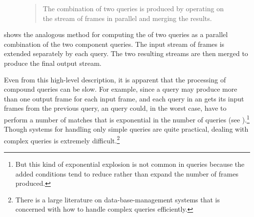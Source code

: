 \begin{figure}[tb]
\label{Figure 4.6}
\centering
\begin{comment}
\heading{Figure 4.6:} The \code{or} combination of two queries is produced
by operating on the stream of frames in parallel and merging the results.

\begin{example}
           +---------------------------+
           |          (or A B)         |
           |    +---+                  |
input      | +->| A |------------+     |  output
stream of  | |  +---+            V     |  stream of
frames     | |    ^          +-------+ |  frames
-------------*    |          | merge +--------------->
           | |    |          +-------+ |
           | |    |              ^     |
           | |    |   +---+      |     |
           | +------->| B +------+     |
           |      |   +---+            |
           |      |     ^              |
           |      |     |              |
           |      +--*--+              |
           +---------|-----------------+
                     |
                 data base
\end{example}
\end{comment}

\begin{quote}
 The  combination of two queries is produced by operating on the stream of frames in parallel and merging the results.
\end{quote}
\end{figure}

 shows the analogous method for computing the
 of two
queries as a parallel combination of the two component queries.  The input
stream of frames is extended separately by each query.  The two resulting
streams are then merged to produce the final output stream.

Even from this high-level description, it is apparent that the processing of
compound queries can be slow.  For example, since a query may produce more than
one output frame for each input frame, and each query in an  gets its
input frames from the previous query, an  query could, in the worst
case, have to perform a number of matches that is exponential in the number of
queries (see ).\footnote{But this kind of exponential
explosion is not common in  queries because the added conditions tend
to reduce rather than expand the number of frames produced.} Though systems for
handling only simple queries are quite practical, dealing with complex queries
is extremely difficult.\footnote{There is a large literature on
data-base-management systems that is concerned with how to handle complex
queries efficiently.}


